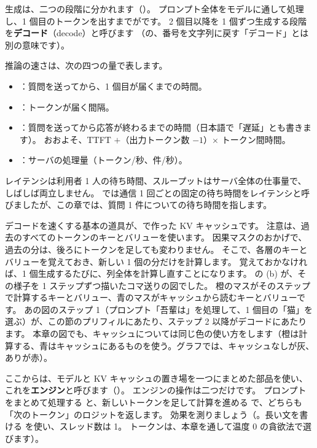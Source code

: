 生成は、二つの段階に分かれます（）。
プロンプト全体をモデルに通して処理し、1 個目のトークンを出すまでがです。
2 個目以降を 1 個ずつ生成する段階を\textbf{デコード}（decode）と呼びます
（の、番号を文字列に戻す「デコード」とは別の意味です）。

\begin{definition}[推論の速さを表す量]\label{def:es-latency}
推論の速さは、次の四つの量で表します。
\begin{itemize}
\item {}：質問を送ってから、1 個目が届くまでの時間。
\item {}：トークンが届く間隔。
\item {}：質問を送ってから応答が終わるまでの時間（日本語で「遅延」とも書きます）。
おおよそ、TTFT $+$（出力トークン数 $-1$）$\times$ トークン間時間。
\item {}：サーバの処理量（トークン/秒、件/秒）。
\end{itemize}
\end{definition}

レイテンシは利用者 1 人の待ち時間、スループットはサーバ全体の仕事量で、しばしば両立しません。
では通信 1 回ごとの固定の待ち時間をレイテンシと呼びましたが、この章では、質問 1 件についての待ち時間を指します。

デコードを速くする基本の道具が、で作った KV キャッシュです。
注意は、過去のすべてのトークンのキーとバリューを使います。
因果マスクのおかげで、過去の分は、後ろにトークンを足しても変わりません。
そこで、各層のキーとバリューを覚えておき、新しい 1 個の分だけを計算します。
覚えておかなければ、1 個生成するたびに、列全体を計算し直すことになります。
の (b) が、その様子を 1 ステップずつ描いたコマ送りの図でした。
橙のマスがそのステップで計算するキーとバリュー、青のマスがキャッシュから読むキーとバリューです。
あの図のステップ 1（プロンプト「吾輩は」を処理して、1 個目の「猫」を選ぶ）が、この節のプリフィルにあたり、ステップ 2 以降がデコードにあたります。
本章の図でも、キャッシュについては同じ色の使い方をします（橙は計算する、青はキャッシュにあるものを使う。グラフでは、キャッシュなしが灰、ありが赤）。

ここからは、モデルと KV キャッシュの置き場を一つにまとめた部品を使い、これを\textbf{エンジン}と呼びます（）。
エンジンの操作は二つだけです。
プロンプトをまとめて処理する  と、新しいトークンを足して計算を進める  で、どちらも「次のトークン」のロジットを返します。
効果を測りましょう（。長い文を書ける  を使い、スレッド数は 1。
トークンは、本章を通して温度 0 の貪欲法で選びます）。

